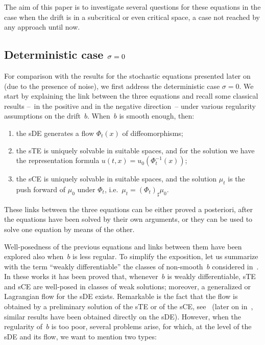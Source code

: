 \documentclass[a4paper,10pt]{article}
\newcommand\1{\mathbbm{1}}
\numberwithin{equation}{section}
\begin{document}
The aim of this paper is to investigate several questions for these equations in the case when the drift is in a subcritical or even critical space, a case not reached by any approach until now.

\subsection{Deterministic case $\protect\sigma=0$}\label{subsection deterministic}

For comparison with the results for the stochastic equations presented later on (due to the presence of noise), we first address the deterministic case $\sigma=0$. We start by explaining the link between the three equations and recall some classical results --~in the positive and in the negative direction~-- under various regularity
assumptions on the drift~$b$. When~$b$ is smooth enough, then:
\begin{enumerate}[font=\normalfont, label=(\roman{*}), ref=(\roman{*})]
  \item the sDE generates a flow $\Phi_{t}(x)$ of diffeomorphisms;
  \item the sTE is uniquely solvable in suitable spaces, and for the solution we have the representation formula $u(t,x) =u_{0}(\Phi_{t}^{-1}(x) )$;
  \item the sCE is uniquely solvable in suitable spaces, and the solution $\mu_{t}$
  is the push forward of $\mu_{0}$ under $\Phi_{t}$, i.e.~$\mu_{t}=(\Phi
  _{t}) _{\sharp}\mu_{0}$.
\end{enumerate}
These links between the three equations can be either proved a posteriori, after the equations have been solved by their own arguments, or they can be used to solve one equation by means of the other.

Well-posedness of the previous equations and links between them have been explored also when~$b$ is less regular. To simplify the exposition, let us summarize with the term ``weakly differentiable'' the classes of non-smooth~$b$ considered in~\cite{DIPELI89,AMBROSIO04}. In these works it has been proved that, whenever~$b$ is
weakly differentiable, sTE and sCE are well-posed in classes of weak solutions; moreover, a generalized or Lagrangian flow for the sDE exists. Remarkable is the fact that the flow is obtained by a preliminary solution of the sTE or of the sCE, see~\cite{DIPELI89,AMBROSIO04} (later on in~\cite{CRIDEL08}, similar results have been obtained directly on the sDE). However, when the regularity of~$b$ is too poor, several problems arise, for which, at the level of the sDE and its flow, we want to mention two types:
\end{document}
